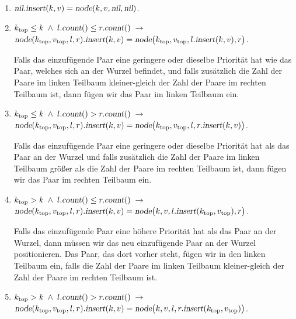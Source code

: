 \begin{enumerate}
\item $\textsl{nil}.\textsl{insert}(k,v) = \textsl{node}(k,v,\textsl{nil}, \textsl{nil})$.
\item $k_{\mathrm{top}} \leq k \;\wedge\; l.\textsl{count}() \leq r.\textsl{count}() \;\rightarrow $   \\[0.1cm]
      \hspace*{1.3cm} 
      $\textsl{node}(k_{\mathrm{top}},v_\mathrm{top},l,r).\textsl{insert}(k,v) =
                 \textsl{node}\bigl(k_\mathrm{top},v_\mathrm{top},l.\textsl{insert}(k,v), r\bigr)$.

      Falls das einzuf\"ugende Paar eine geringere oder dieselbe Priorit\"at hat wie das
      Paar, welches sich an der Wurzel befindet, und falls zus\"atzlich die Zahl der Paare im linken Teilbaum
      kleiner-gleich der Zahl der Paare im rechten Teilbaum ist, dann f\"ugen wir das
      Paar im linken Teilbaum ein.
\item $k_{\mathrm{top}} \leq k \;\wedge\; l.\textsl{count}() > r.\textsl{count}() \;\rightarrow $   \\[0.1cm]
      \hspace*{1.3cm} 
      $\textsl{node}(k_{\mathrm{top}},v_\mathrm{top},l,r).\textsl{insert}(k,v) =
                 \textsl{node}\bigl(k_\mathrm{top},v_\mathrm{top},l,r.\textsl{insert}(k,v)\bigr)$.

      Falls das einzuf\"ugende Paar eine geringere oder dieselbe Priorit\"at hat als das
      Paar an der Wurzel und falls zus\"atzlich die Zahl der Paare im linken Teilbaum
      gr\"o{\ss}er als die Zahl der Paare im rechten Teilbaum ist, dann f\"ugen wir das
      Paar im rechten Teilbaum ein.
\item $k_{\mathrm{top}} > k \;\wedge\; l.\textsl{count}() \leq r.\textsl{count}() \;\rightarrow $ \\[0.1cm]
      \hspace*{1.3cm} 
      $\textsl{node}(k_{\mathrm{top}},v_\mathrm{top},l,r).\textsl{insert}(k,v) =
                 \textsl{node}\bigl(k,v,l.\textsl{insert}(k_\mathrm{top},v_\mathrm{top}), r\bigr)$.

      Falls das einzuf\"ugende Paar eine h\"ohere Priorit\"at hat als das Paar an
      der Wurzel, dann m\"ussen wir das neu einzuf\"ugende Paar an der Wurzel
      positionieren.  Das Paar, das dort vorher steht, f\"ugen wir in den linken
      Teilbaum ein, falls  die Zahl der Paare im linken Teilbaum
      kleiner-gleich der Zahl der Paare im rechten Teilbaum ist.
\item $k_{\mathrm{top}} > k \;\wedge\; l.\textsl{count}() > r.\textsl{count}() \;\rightarrow $ \\[0.1cm] 
      \hspace*{1.3cm} 
      $\textsl{node}(k_{\mathrm{top}},v_\mathrm{top},l,r).\textsl{insert}(k,v) =
                 \textsl{node}\bigl(k,v,l,r.\textsl{insert}(k_\mathrm{top},v_\mathrm{top})\bigr)$.


\end{enumerate}
